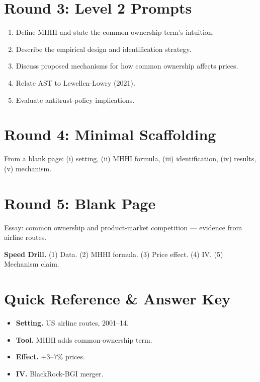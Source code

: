 \documentclass[11pt]{article}
\begin{document}
\section*{Round 3: Level 2 Prompts}
\begin{enumerate}
\item Define MHHI and state the common-ownership term's intuition.
\item Describe the empirical design and identification strategy.
\item Discuss proposed mechanisms for how common ownership affects prices.
\item Relate AST to Lewellen-Lowry (2021).
\item Evaluate antitrust-policy implications.
\end{enumerate}

\section*{Round 4: Minimal Scaffolding}
From a blank page: (i) setting, (ii) MHHI formula, (iii) identification, (iv) results, (v) mechanism.

\section*{Round 5: Blank Page}
Essay: common ownership and product-market competition --- evidence from airline routes.

\vspace{6pt}
\begin{drillbox}
\textbf{Speed Drill.} (1) Data. (2) MHHI formula. (3) Price effect. (4) IV. (5) Mechanism claim.
\end{drillbox}

\section*{Quick Reference \& Answer Key}
\begin{answerbox}
\begin{itemize}
\item \textbf{Setting.} US airline routes, 2001--14.
\item \textbf{Tool.} MHHI adds common-ownership term.
\item \textbf{Effect.} $+3$--$7$\% prices.
\item \textbf{IV.} BlackRock-BGI merger.
\end{itemize}
\end{answerbox}
\end{document}
